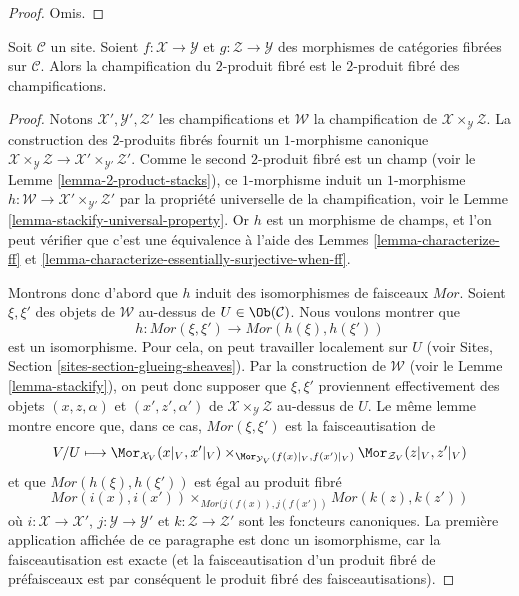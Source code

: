 \begin{proof}
Omis.
\end{proof}

\begin{lemma}
\label{lemma-stackification-fibre-product-fibred-categories}
Soit $\mathcal{C}$ un site.
Soient $f : \mathcal{X} \to \mathcal{Y}$ et $g : \mathcal{Z} \to \mathcal{Y}$
des morphismes de catégories fibrées sur $\mathcal{C}$.
Alors la champification du $2$-produit fibré est le $2$-produit
fibré des champifications.
\end{lemma}

\begin{proof}
Notons $\mathcal{X}', \mathcal{Y}', \mathcal{Z}'$ les champifications
et $\mathcal{W}$ la champification de
$\mathcal{X} \times_\mathcal{Y} \mathcal{Z}$. La construction des $2$-produits
fibrés fournit un $1$-morphisme canonique
$\mathcal{X} \times_\mathcal{Y} \mathcal{Z} \to
\mathcal{X}' \times_{\mathcal{Y}'} \mathcal{Z}'$.
Comme le second $2$-produit fibré est un champ (voir le
Lemme \ref{lemma-2-product-stacks}),
ce $1$-morphisme induit un $1$-morphisme
$h : \mathcal{W} \to \mathcal{X}' \times_{\mathcal{Y}'} \mathcal{Z}'$
par la propriété universelle de la champification, voir le
Lemme \ref{lemma-stackify-universal-property}.
Or $h$ est un morphisme de champs, et l'on peut vérifier que c'est une
équivalence à l'aide des
Lemmes \ref{lemma-characterize-ff} et
\ref{lemma-characterize-essentially-surjective-when-ff}.

\medskip\noindent
Montrons donc d'abord que $h$ induit des isomorphismes de faisceaux $\mathit{Mor}$.
Soient $\xi, \xi'$ des objets de $\mathcal{W}$ au-dessus de
$U \in \Ob(\mathcal{C})$. Nous voulons montrer que
$$
h : \mathit{Mor}(\xi, \xi') \longrightarrow \mathit{Mor}(h(\xi), h(\xi'))
$$
est un isomorphisme. Pour cela, on peut travailler localement sur $U$ (voir
Sites, Section \ref{sites-section-glueing-sheaves}).
Par la construction de $\mathcal{W}$ (voir le
Lemme \ref{lemma-stackify}),
on peut donc supposer que $\xi, \xi'$ proviennent effectivement
des objets $(x, z, \alpha)$ et $(x', z', \alpha')$
de $\mathcal{X} \times_\mathcal{Y} \mathcal{Z}$ au-dessus de $U$.
Le même lemme montre encore que, dans ce cas,
$\mathit{Mor}(\xi, \xi')$ est la faisceautisation de
$$
V/U \longmapsto
\Mor_{\mathcal{X}_V}(x|_V, x'|_V)
\times_{\Mor_{\mathcal{Y}_V}(f(x)|_V, f(x')|_V)}
\Mor_{\mathcal{Z}_V}(z|_V, z'|_V)
$$
et que $\mathit{Mor}(h(\xi), h(\xi'))$ est égal au produit fibré
$$
\mathit{Mor}(i(x), i(x'))
\times_{\mathit{Mor}(j(f(x)), j(f(x'))}
\mathit{Mor}(k(z), k(z'))
$$
où $i : \mathcal{X} \to \mathcal{X}'$,
$j : \mathcal{Y} \to \mathcal{Y}'$ et
$k : \mathcal{Z} \to \mathcal{Z}'$ sont les foncteurs canoniques.
La première application affichée de ce paragraphe est donc un isomorphisme, car
la faisceautisation est exacte (et la faisceautisation d'un produit fibré
de préfaisceaux est par conséquent le produit fibré des faisceautisations).


\end{proof}
